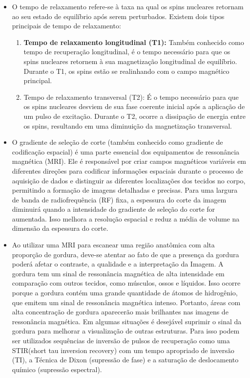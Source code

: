 \documentclass[11pt,a4paper]{article}
\newcounter{exemplo}
\begin{document}
\begin{exemplo}
\begin{itemize}
        \item O tempo de relaxamento refere-se à taxa na qual os spins nucleares retornam ao seu estado de equilíbrio após serem perturbados. Existem dois tipos principais de tempo de relaxamento:
        \begin{enumerate}
            \item \textbf{Tempo de relaxamento longitudinal (T1):} Também conhecido como tempo de recuperação longitudinal, é o tempo necessário para que os spins nucleares retornem à sua magnetização longitudinal de equilíbrio. Durante o T1, os spins estão se realinhando com o campo magnético principal.
            \item Tempo de relaxamento transversal (T2): É o tempo necessário para que os spins nucleares desviem de sua fase coerente inicial após a aplicação de um pulso de excitação. Durante o T2, ocorre a dissipação de energia entre os spins, resultando em uma diminuição da magnetização transversal.
        \end{enumerate}
        
        \item O gradiente de seleção de corte (também conhecido como gradiente de codificação espacial) é uma parte essencial dos equipamentos de ressonância magnética (MRI). Ele é responsável por criar campos magnéticos variáveis em diferentes direções para codificar informações espaciais durante o processo de aquisição de dados e distinguir as diferentes localizações dos tecidos no corpo, permitindo a formação de imagens detalhadas e precisas.  Para uma largura de banda de radiofrequência (RF) fixa, a espessura do corte da imagem diminuirá quando a intensidade do gradiente de seleção do corte for aumentada. Isso melhora a resolução espacial e reduz a média de volume na dimensão da espessura do corte. 
        
        \item Ao utilizar uma MRI para escanear uma região anatômica com alta proporção de gordura, deve-se atentar ao fato de que a presença da gordura poderá afetar o contraste, a qualidade e a interpretação da Imagem. A gordura tem um sinal de ressonância magnética de alta intensidade em comparação com outros tecidos, como músculos, ossos e líquidos. Isso ocorre porque a gordura contém uma grande quantidade de átomos de hidrogênio, que emitem um sinal de ressonância magnética intenso. Portanto, áreas com alta concentração de gordura aparecerão mais brilhantes nas imagens de ressonância magnética. Em algumas situações é desejável suprimir o sinal da gordura para melhorar a visualização de outras estruturas. Para isso podem ser utilizados sequências de inversão de pulsos de recuperação como uma STIR(short tau inversion recovery) com um tempo apropriado de inversão (TI), a Técnica de Dixon (supressão de fase) e a saturação de deslocamento químico (supressão espectral).
        

\end{itemize}
\end{exemplo}
\end{document}
